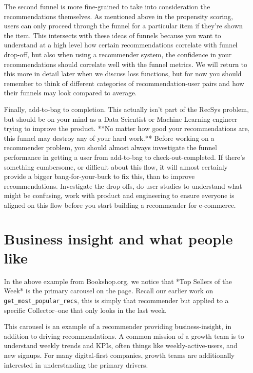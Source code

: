The second funnel is more fine-grained to take into consideration the recommendations themselves. As mentioned above in the propensity scoring, users can only proceed through the funnel for a particular item if they're shown the item. This intersects with these ideas of funnels because you want to understand at a high level how certain recommendations correlate with funnel drop-off, but also when using a recommender system, the confidence in your recommendations should correlate well with the funnel metrics. We will return to this more in detail later when we discuss loss functions, but for now you should remember to think of different categories of recommendation-user pairs and how their funnels may look compared to average.

Finally, add-to-bag to completion. This actually isn't part of the RecSys problem, but should be on your mind as a Data Scientist or Machine Learning engineer trying to improve the product. **No matter how good your recommendations are, this funnel may destroy any of your hard work.** Before working on a recommender problem, you should almost always investigate the funnel performance in getting a user from add-to-bag to check-out-completed. If there's something cumbersome, or difficult about this flow, it will almost certainly provide a bigger bang-for-your-buck to fix this, than to improve recommendations. Investigate the drop-offs, do user-studies to understand what might be confusing, work with product and engineering to ensure everyone is aligned on this flow before you start building a recommender for e-commerce.

\section{Business insight and what people like}

In the above example from Bookshop.org, we notice that *Top Sellers of the Week* is the primary carousel on the page. Recall our earlier work on \lstinline{get_most_popular_recs}, this is simply that recommender but applied to a specific Collector–one that only looks in the last week. 

This carousel is an example of a recommender providing business-insight, in addition to driving recommendations. A common mission of a growth team is to understand weekly trends and KPIs, often things like weekly-active-users, and new signups. For many digital-first companies, growth teams are additionally interested in understanding the primary drivers.

